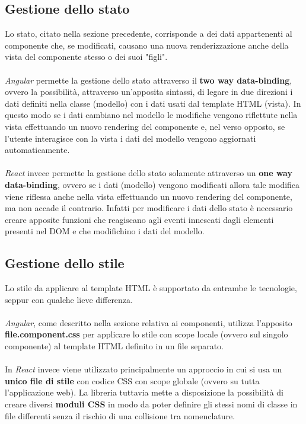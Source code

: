 \subsection{Gestione dello stato}
Lo stato, citato nella sezione precedente, corrisponde a dei dati appartenenti al componente che, se modificati, causano una nuova renderizzazione anche della vista del componente stesso o dei suoi "figli". \\ \\
\textit{Angular} permette la gestione dello stato attraverso il \textbf{two way data-binding}, ovvero la possibilità, attraverso un'apposita sintassi, di legare in due direzioni i dati definiti nella classe (modello) con i dati usati dal template HTML (vista). In questo modo se i dati cambiano nel modello le modifiche vengono riflettute nella vista effettuando un nuovo rendering del componente e, nel verso opposto, se l'utente interagisce con la vista i dati del modello vengono aggiornati automaticamente. \\ \\
\textit{React} invece permette la gestione dello stato solamente attraverso un \textbf{one way data-binding}, ovvero se i dati (modello) vengono modificati allora tale modifica viene riflessa anche nella vista effettuando un nuovo rendering del componente, ma non accade il contrario. Infatti per modificare i dati dello stato è necessario creare apposite funzioni che reagiscano agli eventi innescati dagli elementi presenti nel DOM e che modifichino i dati del modello.

\subsection{Gestione dello stile}
Lo stile da applicare al template HTML è supportato da entrambe le tecnologie, seppur con qualche lieve differenza. \\ \\
\textit{Angular}, come descritto nella sezione relativa ai componenti, utilizza l'apposito \\ \textbf{file.component.css} per applicare lo stile con scope locale (ovvero sul singolo componente) al template HTML definito in un file separato. \\ \\
In \textit{React} invece viene utilizzato principalmente un approccio in cui si usa un \textbf{unico file di stile} con codice CSS con scope globale (ovvero su tutta l'applicazione web). La libreria tuttavia mette a disposizione la possibilità di creare diversi \textbf{moduli CSS} in modo da poter definire gli stessi nomi di classe in file differenti senza il rischio di una collisione tra nomenclature.

